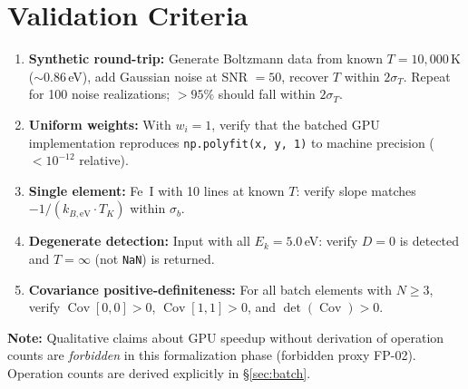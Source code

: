 \documentclass[11pt]{article}
\newcommand{\kbeV}{k_{B,\text{eV}}}
\begin{document}
\section{Validation Criteria}
\label{sec:validation}

\begin{enumerate}
  \item \textbf{Synthetic round-trip:}
    Generate Boltzmann data from known $T = 10{,}000$\,K ($\sim 0.86$\,eV),
    add Gaussian noise at SNR $= 50$, recover $T$ within $2\sigma_T$.
    Repeat for 100 noise realizations; $> 95\%$ should fall within $2\sigma_T$.

  \item \textbf{Uniform weights:}
    With $w_i = 1$, verify that the batched GPU implementation reproduces
    \texttt{np.polyfit(x, y, 1)} to machine precision ($< 10^{-12}$ relative).

  \item \textbf{Single element:}
    Fe~I with 10 lines at known $T$: verify slope matches
    $-1/(\kbeV \cdot T_K)$ within $\sigma_b$.

  \item \textbf{Degenerate detection:}
    Input with all $E_k = 5.0$\,eV: verify $D = 0$ is detected and
    $T = \infty$ (not \texttt{NaN}) is returned.

  \item \textbf{Covariance positive-definiteness:}
    For all batch elements with $N \geq 3$, verify
    $\operatorname{Cov}[0,0] > 0$, $\operatorname{Cov}[1,1] > 0$, and
    $\det(\operatorname{Cov}) > 0$.
\end{enumerate}

\textbf{Note:} Qualitative claims about GPU speedup without derivation of operation
counts are \emph{forbidden} in this formalization phase (forbidden proxy FP-02).
Operation counts are derived explicitly in \S\ref{sec:batch}.
\end{document}
